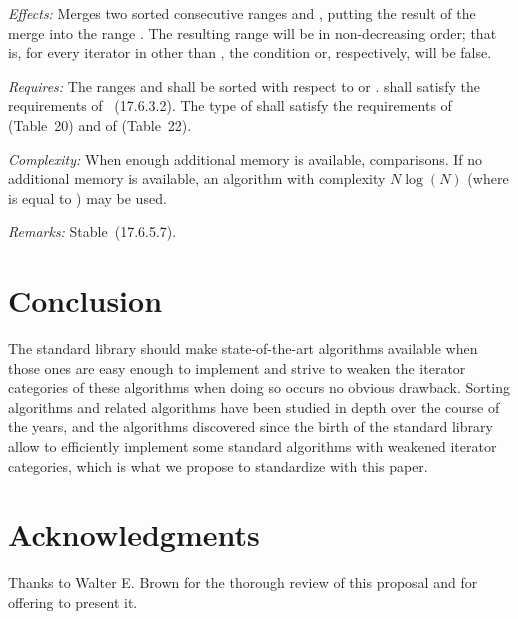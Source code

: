 \documentclass{isocpp_proposal}
\begin{document}
\begin{itemdescr}
\pnum
\emph{Effects:} Merges two sorted consecutive ranges \tcode{[first, middle)} and \tcode{[middle, last)}, putting the result of the merge into the range \tcode{[first, last)}. The resulting range will be in non-decreasing order; that is, for every iterator  in \tcode{[first, last)} other than , the condition  or, respectively,  will be false.

\pnum
\emph{Requires:} The ranges \tcode{[first, middle)} and \tcode{[middle, last)} shall be sorted with respect to  or .   shall satisfy the requirements of ~(17.6.3.2). The type of  shall satisfy the requirements of  (Table~20) and of  (Table~22).

\pnum
\emph{Complexity:} When enough additional memory is available,  comparisons. If no additional memory is available, an algorithm with complexity $N \log{} (N)$ (where  is equal to ) may be used.

\pnum
\emph{Remarks:} Stable~(17.6.5.7).
\end{itemdescr}

\section{Conclusion}

The standard library should make state-of-the-art algorithms available when those ones are easy enough to implement and strive to weaken the iterator categories of these algorithms when doing so occurs no obvious drawback. Sorting algorithms and related algorithms have been studied in depth over the course of the years, and the algorithms discovered since the birth of the standard library allow to efficiently implement some standard algorithms with weakened iterator categories, which is what we propose to standardize with this paper.

\section{Acknowledgments}

Thanks to Walter E. Brown for the thorough review of this proposal and for offering to present it.
\end{document}
